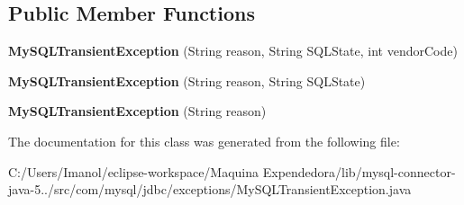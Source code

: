\subsection*{Public Member Functions}
\begin{DoxyCompactItemize}
\item 
\mbox{\label{classcom_1_1mysql_1_1jdbc_1_1exceptions_1_1_my_s_q_l_transient_exception_a807ead7bb10e13f00f29bc98c30f92a7}} 
{\bfseries My\+S\+Q\+L\+Transient\+Exception} (String reason, String S\+Q\+L\+State, int vendor\+Code)
\item 
\mbox{\label{classcom_1_1mysql_1_1jdbc_1_1exceptions_1_1_my_s_q_l_transient_exception_ab82f6287ad0fafea03b06ed15a26dbc6}} 
{\bfseries My\+S\+Q\+L\+Transient\+Exception} (String reason, String S\+Q\+L\+State)
\item 
\mbox{\label{classcom_1_1mysql_1_1jdbc_1_1exceptions_1_1_my_s_q_l_transient_exception_a3fe1fbae3b554c1fb8e406ebe84a5668}} 
{\bfseries My\+S\+Q\+L\+Transient\+Exception} (String reason)
\end{DoxyCompactItemize}


The documentation for this class was generated from the following file\+:\begin{DoxyCompactItemize}
\item 
C\+:/\+Users/\+Imanol/eclipse-\/workspace/\+Maquina Expendedora/lib/mysql-\/connector-\/java-\/5../src/com/mysql/jdbc/exceptions/My\+S\+Q\+L\+Transient\+Exception.\+java\end{DoxyCompactItemize}
